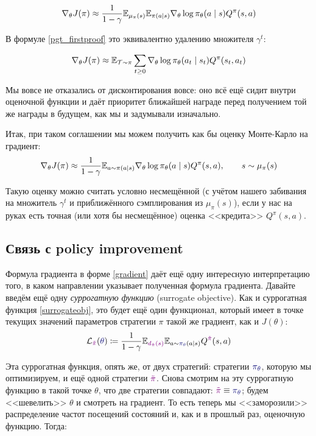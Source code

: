 \begin{equation*}
\nabla_{\theta} J(\pi) \approx \frac{1}{1 - \gamma}\mathbb{E}_{\mu_\pi(s)} \mathbb{E}_{\pi(a \mid s)} \nabla_{\theta} \log \pi_\theta (a \mid s) Q^{\pi}(s, a)
\end{equation*}

В формуле \eqref{pgt_firstproof} это эквивалентно удалению множителя $\gamma^t$:

\begin{equation*}
\nabla_{\theta} J(\pi) \approx \mathbb{E}_{\mathcal{T} \sim \pi} \sum_{t \ge 0} \nabla_{\theta} \log \pi_\theta (a_t \mid s_t) Q^{\pi}(s_t, a_t)
\end{equation*}

Мы вовсе не отказались от дисконтирования вовсе: оно всё ещё сидит внутри оценочной функции и даёт приоритет ближайшей награде перед получением той же награды в будущем, как мы и задумывали изначально.

Итак, при таком соглашении мы можем получить как бы оценку Монте-Карло на градиент:
$$\nabla_{\theta} J(\pi) \approx \frac{1}{1 - \gamma}\mathbb{E}_{a \sim \pi(a \mid s)} \nabla_{\theta} \log \pi_\theta (a \mid s) Q^{\pi}(s, a), \qquad s \sim \mu_\pi(s)$$

Такую оценку можно считать условно несмещённой (с учётом нашего забивания на множитель $\gamma^t$ и приближённого сэмплирования из $\mu_{\pi}(s)$), если у нас на руках есть точная (или хотя бы несмещённое) оценка <<кредита>> $Q^\pi(s, a)$.

\subsection{Связь с policy improvement}

Формула градиента в форме \eqref{gradient} даёт ещё одну интересную интерпретацию того, в каком направлении указывает полученная формула градиента. Давайте введём ещё одну \emph{суррогатную функцию} (surrogate objective). Как и суррогатная функция \eqref{surrogateobj}, это будет ещё один функционал, который имеет в точке текущих значений параметров стратегии $\pi$ такой же градиент, как и $J(\theta)$:
$$\mathcal{L}_{\textcolor{ChadPurple}{\tilde{\pi}}}(\textcolor{ChadBlue}{\theta}) \coloneqq \frac{1}{1 - \gamma}\E_{\textcolor{ChadPurple}{d_{\tilde{\pi}}(s)}} \E_{a \sim \textcolor{ChadBlue}{\pi_{\theta}}(a \mid s)} Q^{\textcolor{ChadPurple}{\tilde{\pi}}}(s, a)$$

Эта суррогатная функция, опять же, от двух стратегий: стратегии $\textcolor{ChadBlue}{\pi_{\theta}}$, которую мы оптимизируем, и ещё одной стратегии $\textcolor{ChadPurple}{\tilde{\pi}}$. Снова смотрим на эту суррогатную функцию в такой точке $\theta$, что две стратегии совпадают: $\textcolor{ChadPurple}{\tilde{\pi}} \HM\equiv \textcolor{ChadBlue}{\pi_{\theta}}$; будем <<шевелить>> $\theta$ и смотреть на градиент. То есть теперь мы <<заморозили>> распределение частот посещений состояний и, как и в прошлый раз, оценочную функцию. Тогда:

